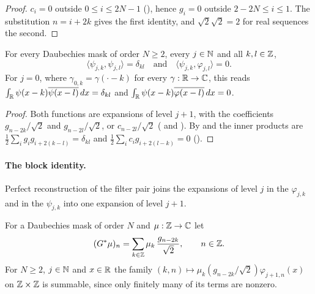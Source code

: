 \begin{proof}
\leanok
{}
$c_i = 0$ outside $0 \leq i \leq 2N - 1$ (), hence $g_i = 0$ outside
$2 - 2N \leq i \leq 1$. The substitution $n = i + 2k$ gives the first identity, and
$\sqrt 2 \sqrt 2 = 2$ for real sequences the second.
\end{proof}

\begin{theorem}
\label{thm:daub-wavelet-orthonormal}
\leanok
{}
For every Daubechies mask of order $N \geq 2$, every $j \in \mathbb{N}$ and all $k, l \in \mathbb{Z}$,
\[
  \langle \psi_{j,k}, \psi_{j,l} \rangle = \delta_{kl} \quad\text{and}\quad
  \langle \psi_{j,k}, \varphi_{j,l} \rangle = 0 .
\]
For $j = 0$, where $\gamma_{0,k} = \gamma(\cdot - k)$ for every $\gamma : \mathbb{R} \to \mathbb{C}$, this reads
$\int_{\mathbb{R}} \psi(x - k) \overline{\psi(x - l)} \, dx = \delta_{kl}$ and
$\int_{\mathbb{R}} \psi(x - k) \overline{\varphi(x - l)} \, dx = 0$.
\end{theorem}

\begin{proof}
\leanok
{}
Both functions are expansions of level $j + 1$, with the coefficients $g_{n-2k}/\sqrt 2$ and
$g_{n-2l}/\sqrt 2$, or $c_{n-2l}/\sqrt 2$ ( and
). By  and
 the inner products are
$\frac12 \sum_i g_i g_{i + 2(k-l)} = \delta_{kl}$ and $\frac12 \sum_i c_i g_{i + 2(l-k)} = 0$
().
\end{proof}

\paragraph{The block identity.}
Perfect reconstruction of the filter pair joins the expansions of level $j$ in the
$\varphi_{j,k}$ and in the $\psi_{j,k}$ into one expansion of level $j + 1$.

\begin{definition}
\label{def:daub-wavelet-refine-coeff}
\leanok
{}
For a Daubechies mask of order $N$ and $\mu : \mathbb{Z} \to \mathbb{C}$ let
\[
  (G^* \mu)_n = \sum_{k \in \mathbb{Z}} \mu_k \, \frac{g_{n-2k}}{\sqrt 2} , \qquad n \in \mathbb{Z} .
\]
For $N \geq 2$, $j \in \mathbb{N}$ and $x \in \mathbb{R}$ the family
$(k, n) \mapsto \mu_k (g_{n-2k}/\sqrt 2) \varphi_{j+1,n}(x)$ on $\mathbb{Z} \times \mathbb{Z}$ is summable,
since only finitely many of its terms are nonzero.
\end{definition}

